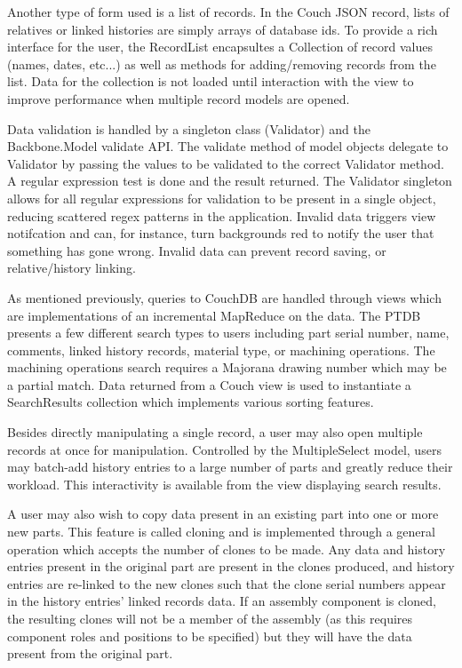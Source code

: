 \documentclass[journal]{IEEEtran}
\begin{document}
Another type of form used is a list of records. 
In the Couch JSON record, lists of relatives or linked histories are simply arrays of database ids. To provide a rich
interface for the user, the RecordList encapsultes a Collection of record values (names, dates, etc...)
as well as methods for adding/removing records from the list. Data for the collection is not loaded
until interaction with the view to improve performance when multiple record models are opened.

Data validation is handled by a singleton class (Validator) and the Backbone.Model validate API. The validate
method of model objects delegate to Validator by passing the values to be validated to the correct
Validator method. A regular expression test is done and the result returned. The Validator singleton
allows for all regular expressions for validation to be present in a single object, reducing scattered
regex patterns in the application. Invalid data triggers view notifcation and can, for instance, turn backgrounds 
red to notify the user that something has gone wrong. Invalid data can prevent record saving, or relative/history linking.

As mentioned previously, queries to CouchDB are handled through views which are implementations of an
incremental MapReduce on the data. The PTDB presents a few different search types to users including
part serial number, name, comments, linked history records, material type, or machining operations.
The machining operations search requires a Majorana drawing number which may be a partial match. Data
returned from a Couch view is used to instantiate a SearchResults collection which implements various
sorting features.

Besides directly manipulating a single record, a user may also open multiple records at once for 
manipulation. Controlled by the MultipleSelect model, users may batch-add history entries to a
large number of parts and greatly reduce their workload. This interactivity is available from
the view displaying search results.

A user may also wish to copy data present in an existing part into one or more new parts. This
feature is called cloning and is implemented through a general operation which accepts the number
of clones to be made. Any data and history entries present in the original part are present in the
clones produced, and history entries are re-linked to the new clones such that the clone serial
numbers appear in the history entries' linked records data. If an assembly component is cloned, the
resulting clones will not be a member of the assembly (as this requires component roles and positions
to be specified) but they will have the data present from the original part.
\end{document}

